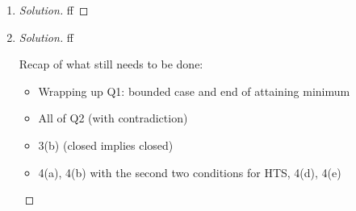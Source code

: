\documentclass{article}
\begin{document}
\begin{enumerate}
\begin{proof}[Solution]
			Since $0 \in U$, there exists a finite set $V\subseteq \ell^2$
			such that $\Omega(0;V) \subseteq U$.
			If $V = \emptyset$, then $\Omega(0;V) = \ell^3$
			since $-1 < \langle v, y-x \rangle < 1$ is now
			vacuously true for all $y \in \ell^2$;
			then $\Omega(0;V) \cap S$ since $\hat{\mathbf{e}}_1 \in \ell^2 \cap S$,
			and since $\Omega(0;V) \subseteq U$, $U \cap S \neq \emptyset$.
			So now assume $V$ is not empty.
			Denote the elements of $V$ as $v^{i}$ where $1 \leq i \leq k$.
			Then since $v^i \in \ell^2$,
			we must have that $\lim_n (v^i_n)^2 = 0$ (crude divergence test).
			Then there exists some $N_i$ where $(v^i_{N_i})^2 < 1$ by the definition of convergence.
			Let $N = \min_i\{N_i\}$.
			Then $-1 < v^i_N < 1$ as well.
			See
			\[
				\langle v^i, \hat{\mathbf{e}}_N \rangle =
				\sum_{n=1}^\infty v^i_n (\hat{\mathbf{e}}_N)_n
				= v^i_N
			\]
			Thus $\hat{\mathbf{e}}_N \in \Omega(0,V)$ since
			$-1 < \langle v, \hat{\mathbf{e}}_N - 0 \rangle = v_N < 1$
			for all $v \in V$.
			Thus, $\hat{\mathbf{e}}_N \in \Omega(0,V) \subseteq U$.
			Since $\hat{\mathbf{e}}_N \in S$,
			thus shows that $S \cap U \neq \emptyset$,
			so we are done since $U$ was arbitrary
			(this works for any open $U \in \mathcal{N}(0)$).
	\end{proof}
	\item \begin{proof}[Solution]\let\qed\relax
		ff
	\end{proof}
	\item \begin{proof}[Solution]\let\qed\relax
		ff

		Recap of what still needs to be done:
		\begin{itemize}
			\item Wrapping up Q1: bounded case and end of attaining minimum
			\item All of Q2 (with contradiction)
			\item 3(b) (closed implies closed)
			\item 4(a), 4(b) with the second two conditions for HTS,
				4(d), 4(e)
		\end{itemize}
	\end{proof}
\end{enumerate}
\clearpage
\end{document}
